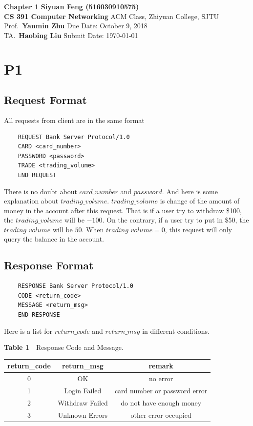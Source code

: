 \documentclass[a4paper, 11pt]{article}
\begin{document}
\noindent
\large\textbf{Chapter 1} \hfill \textbf{Siyuan Feng (516030910575)} \\
\normalsize {\bf CS 391 Computer Networking} \hfill ACM Class, Zhiyuan College, SJTU\\
Prof.~{\bf Yanmin Zhu} \hfill Due Date: October 9, 2018\\
TA.~{\bf Haobing Liu} \hfill Submit Date: \today

\section*{P1}
	\subsection*{Request Format}
\hspace{14pt} All requests from client are in the same format
	\begin{lstlisting}
	REQUEST Bank Server Protocol/1.0
	CARD <card_number>
	PASSWORD <password>
	TRADE <trading_volume>
	END REQUEST
	\end{lstlisting}
	
There is no doubt about $card\_number$ and $password$. And here is some explanation about $trading\_volume$. $trading\_volume$ is change of the amount of money in the account after this request. That is if a user try to withdraw \$100, the $trading\_volume$ will be $-100$. On the contrary, if a user try to put in  \$50, the $trading\_volume$ will be $50$. When $trading\_volume=0$, this request will only query the balance in the account.
	
	\subsection*{Response Format}
	\begin{lstlisting}
	RESPONSE Bank Server Protocol/1.0
	CODE <return_code>
	MESSAGE <return_msg>
	END RESPONSE
	\end{lstlisting}
	
Here is a list for $return\_code$ and $return\_msg$ in different conditions.

	\begin{table}[!htp]
		\centering
		\textbf{Table 1}~~Response Code and Message.\\
		\setlength{\tabcolsep}{7mm}
		\begin{tabular}{c c c} 
		\toprule
		return\_code & return\_msg & remark\\
		\midrule
		 0 & OK & no error\\
		1 & Login Failed & card number or password error\\
		2 & Withdraw Failed & do not have enough money\\
		3 & Unknown Errors & other error occupied \\
		\bottomrule
		\end{tabular}
	\end{table}
	
\end{document}
